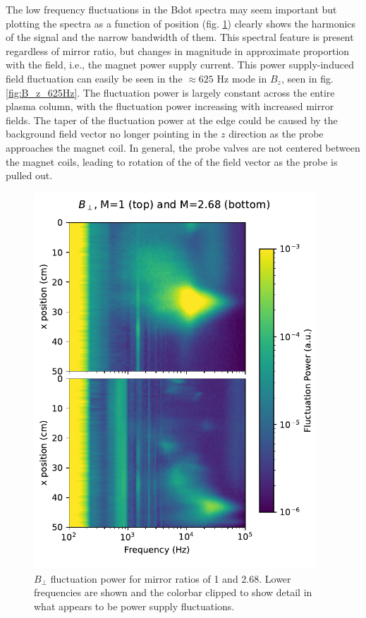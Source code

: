 The low frequency fluctuations in the Bdot spectra may seem important but plotting the spectra as a function of position (fig. \ref{fig_extra:Bperp_lowfreq_profile}) clearly shows the harmonics of the signal and the narrow bandwidth of them. This spectral feature is present regardless of mirror ratio, but changes in magnitude in approximate proportion with the field, i.e., the magnet power supply current. This power supply-induced field fluctuation can easily be seen in the $\approx 625$ Hz mode in $B_z$, seen in fig. \ref{fig:B_z_625Hz}. The fluctuation power is largely constant across the entire plasma column, with the fluctuation power increasing with increased mirror fields. The taper of the fluctuation power at the edge could be caused by the background field vector no longer pointing in the $z$ direction as the probe approaches the magnet coil. In general, the probe valves are not centered between the magnet coils, leading to rotation of the of the field vector as the probe is pulled out.

\begin{figure}
    \centering
    \includegraphics[width=300pt]{figures/extra/bperp_x-vs-f_lowfreq_M=1_and_2-68}
    \caption[$B_\perp$ fluctuation power profiles for low frequencies]{$B_\perp$ fluctuation power for mirror ratios of 1 and 2.68. Lower frequencies are shown and the colorbar clipped to show detail in what appears to be power supply fluctuations.}
    \label{fig_extra:Bperp_lowfreq_profile}
\end{figure}


